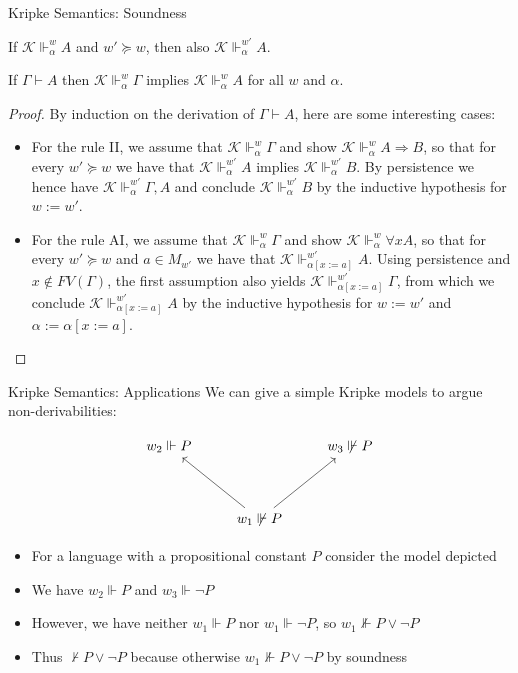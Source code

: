 \documentclass[xcolor=dvipsnames,aspectratio=169,handout]{beamer}
\renewcommand{\to}{\Rightarrow}
\newcommand{\KK}{\mathcal{K}}
\begin{document}
\begin{frame}{Kripke Semantics: Soundness}
	\pause
	\begin{lemma}[Persistence]
		If $\KK\Vdash^w_\alpha A$ and $w'\succeq w$, then also $\KK\Vdash^{w'}_\alpha A$.
	\end{lemma}
	\vspace{-0.2cm}
	\pause
	\begin{theorem}
		If $\Gamma\vdash A$ then $\KK\Vdash^{w}_\alpha \Gamma$ implies $\KK\Vdash^{w}_\alpha A$ for all $w$ and $\alpha$.
	\end{theorem}
	\vspace{-0.2cm}
	\pause
	\begin{proof}
		By induction on the derivation of $\Gamma\vdash A$, here are some interesting cases:
		\pause
		\begin{itemize}
			\pause
			\item
			For the rule II, we assume that $\KK\Vdash^{w}_\alpha \Gamma$ and show $\KK\Vdash^{w}_\alpha A \to B$, so that for every $w'\succeq w$ we have that $\KK\Vdash^{w'}_\alpha A$ implies $\KK\Vdash^{w'}_\alpha B$.
			By persistence we hence have $\KK\Vdash^{w'}_\alpha \Gamma,A$ and conclude $\KK\Vdash^{w'}_\alpha B$ by the inductive hypothesis for $w:=w'$.
			\pause
			\item
			For the rule AI, we assume that $\KK\Vdash^{w}_\alpha \Gamma$ and show $\KK\Vdash^{w}_\alpha \forall x A$, so that for every $w'\succeq w$ and $a\in M_{w'}$ we have that $\KK\Vdash^{w'}_{\alpha[x:=a]} A$.
			Using persistence and $x\not\in FV(\Gamma)$, the first assumption also yields $\KK\Vdash^{w'}_{\alpha[x:=a]} \Gamma$, from which we conclude $\KK\Vdash^{w'}_{\alpha[x:=a]} A$ by the inductive hypothesis for $w:=w'$ and $\alpha := \alpha[x:=a]$.
			\qedhere
		\end{itemize}
	\end{proof}
\end{frame}

\begin{frame}[fragile]{Kripke Semantics: Applications}
	\pause
	We can give a simple Kripke models to argue non-derivabilities:
	
	\pause
	\vspace{0.2cm}
	$$
	\begin{tikzcd}[row sep=huge]
		w_2 \Vdash P &
		 &
		w_3 \not\Vdash P
		\\
		& w_1\not\Vdash P\arrow[ul]\arrow[ur] &
	\end{tikzcd}
	$$
	\vspace{0.2cm}
	
	\pause
	\begin{itemize}
		\item
		For a language with a propositional constant $P$ consider the model depicted
		\pause
		\item
		We have $w_2 \Vdash P$ and $w_3\Vdash \neg P$
		\pause
		\item
		However, we have neither $w_1 \Vdash P$ nor $w_1\Vdash \neg P$, so $w_1\not\Vdash P\lor \neg P$
		\pause
		\item
		Thus $\not\vdash P\lor \neg P$ because otherwise $w_1\not\Vdash P\lor \neg P$ by soundness
	\end{itemize}
\end{frame}
\end{document}
